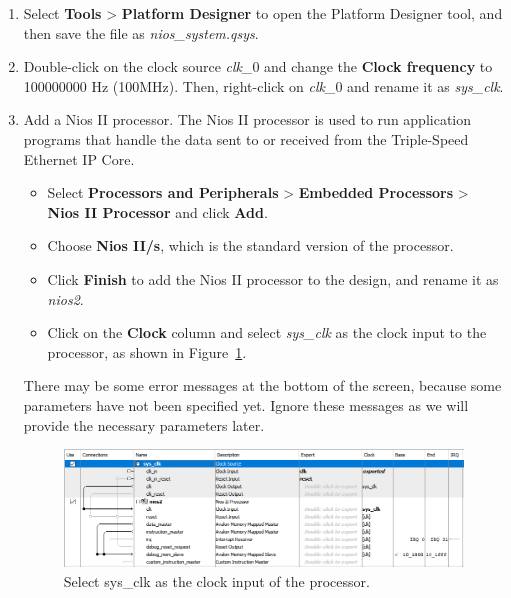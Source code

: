 \documentclass[11pt, twoside, pdftex]{article}
\begin{document}
\begin{enumerate}
	\item Select {\bf Tools} > {\bf Platform Designer} to open the Platform Designer tool, and then save the file as {\it nios\_system.qsys}.

	\item Double-click on the clock source {\it clk\_}0 and change the {\bf Clock frequency} to 100000000 Hz (100MHz). Then, right-click on {\it clk\_}0 and rename it as {\it sys\_clk}. 

	\item Add a Nios II processor. The Nios II processor is used to run application programs that handle the data sent to or received from the Triple-Speed Ethernet IP Core. 
		\begin{itemize}	
			\item Select {\bf Processors and Peripherals} > {\bf Embedded Processors} > {\bf Nios II Processor} and click {\bf Add}.
			\item Choose {\bf Nios II/s}, which is the standard version of the processor. 
			\item Click {\bf Finish} to add the Nios II processor to the design, and rename it as {\it nios2}.
			\item Click on the {\bf Clock} column and select {\it sys\_clk} as the clock input to the processor, as shown in Figure~\ref{fig:processor_clk_select}. 
		\end{itemize}
		There may be some error messages at the bottom of the screen, because some parameters have not been specified yet. Ignore these messages as we will provide the necessary parameters later.

		\begin{figure}[H]
			\centering
			  \includegraphics[scale=0.70]{figures/processor_clk_select.png}
			\caption{Select sys\_clk as the clock input of the processor.} 
			\label{fig:processor_clk_select}
		\end{figure}


\end{enumerate}
\end{document}
